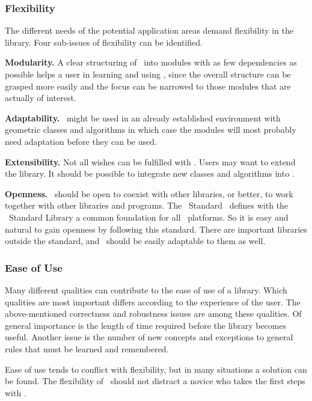 \subsubsection*{Flexibility}
The different needs of the potential application areas demand 
flexibility in the library. Four sub-issues of flexibility can be identified.

{\bf Modularity.}
A clear structuring of \cgal\ into modules with as few dependencies as
possible helps a user in learning and using \cgal, since the overall
structure can be grasped more easily and the focus can be narrowed to
those modules that are actually of interest. 

{\bf Adaptability.}
\cgal\ might be used in an already established environment with
geometric classes and algorithms in which case the modules will 
most probably need adaptation before they can be used. 

{\bf Extensibility.}
Not all wishes can be fulfilled with \cgal. Users may want to
extend the library. It should be possible to integrate new 
classes and algorithms into \cgal.

{\bf Openness.}
\cgal\ should be open to coexist with other libraries, or better, to
work together with other libraries and programs. The \CC\ 
Standard~\cite{cgal:ansi-is14882-98}
\ccIndexMainItem{\stl}
defines with the \CC\ Standard Library a common
foundation for all \CC\ platforms. 
So it is easy and natural to gain openness by following this standard.
There are important libraries outside the standard, and \cgal\
should be easily adaptable to them as well.

\subsubsection*{Ease of Use}
Many different qualities can contribute to the ease of use of a
library. Which qualities are most important differs according to 
the experience of the user.
The above-mentioned correctness and robustness issues are among
these qualities. Of general importance is the length of time required
before the library becomes useful. Another issue is the number of 
new concepts and
exceptions to general rules that must be learned and remembered.

Ease of use tends to conflict with flexibility, but in many
situations a solution can be found.
The flexibility of \cgal\ should not distract a novice who takes the 
first steps with \cgal.
\ccIndexSubitem{ease of use}{vs. flexibility}

